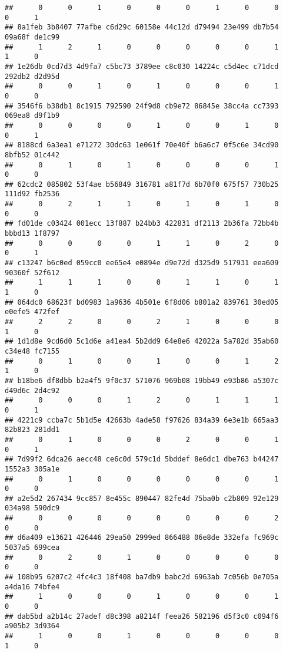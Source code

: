 \documentclass[
]{article}
\begin{document}
\begin{verbatim}
##      0      0      1      0      0      0      1      0      0      0      1 
## 8a1feb 3b8407 77afbe c6d29c 60158e 44c12d d79494 23e499 db7b54 09a68f de1c99 
##      1      2      1      0      0      0      0      0      1      1      0 
## 1e26db 0cd7d3 4d9fa7 c5bc73 3789ee c8c030 14224c c5d4ec c71dcd 292db2 d2d95d 
##      0      0      1      0      1      0      0      0      1      0      0 
## 3546f6 b38db1 8c1915 792590 24f9d8 cb9e72 86845e 38cc4a cc7393 069ea8 d9f1b9 
##      0      0      0      0      1      0      0      1      0      0      1 
## 8188cd 6a3ea1 e71272 30dc63 1e061f 70e40f b6a6c7 0f5c6e 34cd90 8bfb52 01c442 
##      0      1      0      1      0      0      0      0      1      0      0 
## 62cdc2 085802 53f4ae b56849 316781 a81f7d 6b70f0 675f57 730b25 111d92 fb2536 
##      0      2      1      1      0      1      0      1      0      0      0 
## fd01de c03424 001ecc 13f887 b24bb3 422831 df2113 2b36fa 72bb4b bbbd13 1f8797 
##      0      0      0      0      1      1      0      2      0      0      1 
## c13247 b6c0ed 059cc0 ee65e4 e0894e d9e72d d325d9 517931 eea609 90360f 52f612 
##      1      1      1      0      0      1      1      0      1      1      0 
## 064dc0 68623f bd0983 1a9636 4b501e 6f8d06 b801a2 839761 30ed05 e0efe5 472fef 
##      2      2      0      0      2      1      0      0      0      1      0 
## 1d1d8e 9cd6d0 5c1d6e a41ea4 5b2dd9 64e8e6 42022a 5a782d 35ab60 c34e48 fc7155 
##      0      1      0      0      1      0      0      1      2      1      0 
## b18be6 df8dbb b2a4f5 9f0c37 571076 969b08 19bb49 e93b86 a5307c d49d6c 2d4c92 
##      0      0      0      1      2      0      1      1      1      0      1 
## 4221c9 ccba7c 5b1d5e 42663b 4ade58 f97626 834a39 6e3e1b 665aa3 82b823 281dd1 
##      0      1      0      0      0      2      0      0      1      0      1 
## 7d99f2 6dca26 aecc48 ce6c0d 579c1d 5bddef 8e6dc1 dbe763 b44247 1552a3 305a1e 
##      0      1      0      0      0      0      0      0      1      0      0 
## a2e5d2 267434 9cc857 8e455c 890447 82fe4d 75ba0b c2b809 92e129 034a98 590dc9 
##      0      0      0      0      0      0      0      0      2      0      0 
## d6a409 e13621 426446 29ea50 2999ed 866488 06e8de 332efa fc969c 5037a5 699cea 
##      0      2      0      1      0      0      0      0      0      0      0 
## 108b95 6207c2 4fc4c3 18f408 ba7db9 babc2d 6963ab 7c056b 0e705a a4da16 74bfe4 
##      1      0      0      0      1      0      0      0      1      0      0 
## dab5bd a2b14c 27adef d8c398 a8214f feea26 582196 d5f3c0 c094f6 a905b2 3d9364 
##      1      0      0      1      0      0      0      0      0      1      0 

\end{verbatim}
\end{document}
